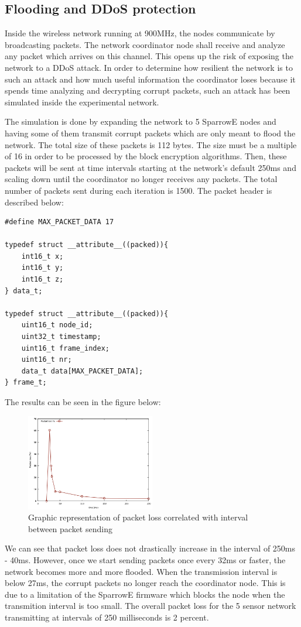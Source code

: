 \subsection{Flooding and DDoS protection}

Inside the wireless network running at 900MHz, the nodes communicate by broadcasting packets.
The network coordinator node shall receive and analyze any packet which arrives on this channel.
This opens up the risk of exposing the network to a DDoS attack. In order to determine how 
resilient the network is to such an attack and how much useful information the coordinator 
loses because it spends time analyzing and decrypting corrupt packets, such an attack has been 
simulated inside the experimental network.

The simulation is done by expanding the network to 5 SparrowE nodes and having some of them transmit 
corrupt packets which are only meant to flood the network. The total size of these packets is 
112 bytes. The size must be a multiple of 16 in order to be processed by the block encryption 
algorithms. Then, these packets will be sent at time intervals starting at the network's default 
250ms and scaling down until the coordinator no longer receives any packets. The total number 
of packets sent during each iteration is 1500. The packet header is described below:

\begin{lstlisting}
#define MAX_PACKET_DATA 17

typedef struct __attribute__((packed)){
	int16_t x;
	int16_t y;
	int16_t z;
} data_t;

typedef struct __attribute__((packed)){
	uint16_t node_id;
	uint32_t timestamp;
	uint16_t frame_index;
	uint16_t nr;
	data_t data[MAX_PACKET_DATA];
} frame_t;
\end{lstlisting}

The results can be seen in the figure below:

\begin{figure}[ht] \centering
  \includegraphics[width=0.5\textwidth]{img/packet-loss.png}
  \caption{Graphic representation of packet loss correlated with interval between packet sending}
\end{figure}

We can see that packet loss does not drastically increase in the interval of 250ms - 40ms. However, 
once we start sending packets once every 32ms or faster, the network becomes more and more flooded.
When the transmission interval is below 27ms, the corrupt packets no longer reach the coordinator
node. This is due to a limitation of the SparrowE firmware which blocks the node when the transmition 
interval is too small. The overall packet loss for the 5 sensor network transmitting at 
intervals of 250 milliseconds is 2 percent.
